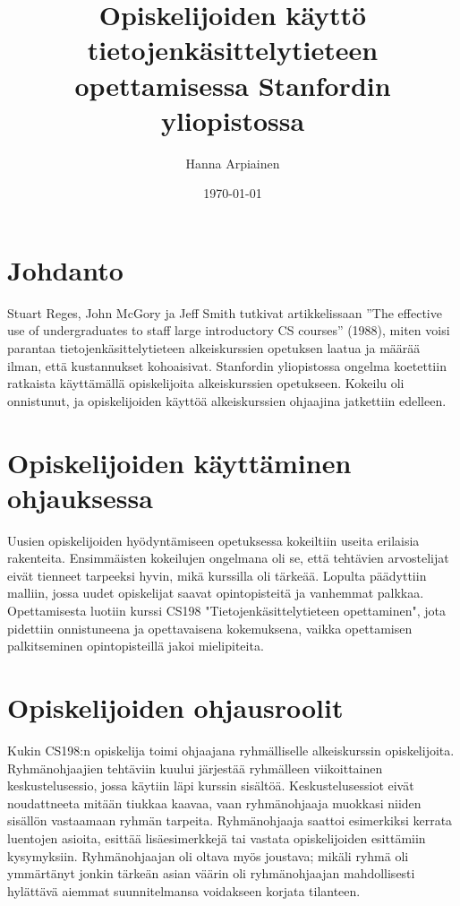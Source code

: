 \documentclass[finnish]{tktltiki2}
\title{﻿Opiskelijoiden käyttö tietojenkäsittelytieteen opettamisessa Stanfordin yliopistossa}
\author{Hanna Arpiainen}
\date{\today}
\theoremstyle{definition}
\theoremstyle{remark}
\begin{document}
\maketitle
\makeabstract

\tableofcontents
\newpage



\section{Johdanto}

Stuart Reges, John McGory ja Jeff Smith tutkivat artikkelissaan ”The effective use of undergraduates to staff large introductory CS courses” (1988), miten voisi parantaa tietojenkäsittelytieteen alkeiskurssien opetuksen laatua ja määrää ilman, että kustannukset kohoaisivat. Stanfordin yliopistossa ongelma koetettiin ratkaista käyttämällä opiskelijoita alkeiskurssien opetukseen. Kokeilu oli onnistunut, ja opiskelijoiden käyttöä alkeiskurssien ohjaajina jatkettiin edelleen. 




\section{Opiskelijoiden käyttäminen ohjauksessa}

Uusien opiskelijoiden hyödyntämiseen opetuksessa kokeiltiin useita erilaisia rakenteita. Ensimmäisten kokeilujen ongelmana oli se, että  tehtävien arvostelijat eivät tienneet tarpeeksi hyvin, mikä kurssilla oli tärkeää. Lopulta päädyttiin malliin, jossa uudet opiskelijat saavat opintopisteitä ja vanhemmat palkkaa. Opettamisesta luotiin kurssi CS198 "Tietojenkäsittelytieteen opettaminen", jota pidettiin onnistuneena ja opettavaisena kokemuksena, vaikka opettamisen palkitseminen opintopisteillä jakoi mielipiteita.



\section{Opiskelijoiden ohjausroolit}

Kukin CS198:n opiskelija toimi ohjaajana ryhmälliselle alkeiskurssin opiskelijoita. Ryhmänohjaajien tehtäviin kuului järjestää ryhmälleen viikoittainen keskustelusessio, jossa käytiin läpi kurssin sisältöä. Keskustelusessiot eivät noudattneeta mitään tiukkaa kaavaa, vaan ryhmänohjaaja muokkasi niiden sisällön vastaamaan ryhmän tarpeita. Ryhmänohjaaja saattoi esimerkiksi kerrata luentojen asioita, esittää lisäesimerkkejä tai vastata opiskelijoiden esittämiin kysymyksiin. Ryhmänohjaajan oli oltava myös joustava; mikäli ryhmä oli ymmärtänyt jonkin tärkeän asian väärin oli ryhmänohjaajan mahdollisesti hylättävä aiemmat suunnitelmansa voidakseen korjata tilanteen.
\end{document}

